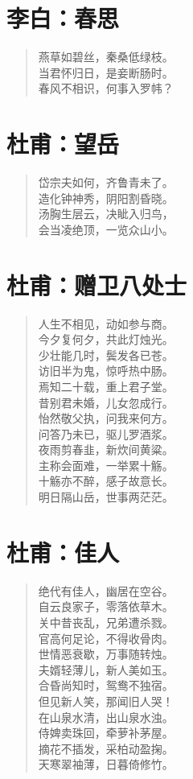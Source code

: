 \documentclass[12pt,oneside]{book}
\newenvironment{shici}{
\begin{verse}
\centering\large\hspace{12pt}}
{\end{verse}}
\begin{document}
\chapter{李白：春思}
\begin{shici}
燕草如碧丝，秦桑低绿枝。\\
当君怀归日，是妾断肠时。\\
春风不相识，何事入罗帏？
\end{shici}

\chapter{杜甫：望岳}
\begin{shici}
岱宗夫如何，齐鲁青未了。\\
造化钟神秀，阴阳割昏晓。\\
汤胸生层云，决眦入归鸟，\\
会当凌绝顶，一览众山小。
\end{shici}


\chapter{杜甫：赠卫八处士}
\begin{shici}
人生不相见，动如参与商。\\
今夕复何夕，共此灯烛光。\\
少壮能几时，鬓发各已苍。\\
访旧半为鬼，惊呼热中肠。\\
焉知二十载，重上君子堂。\\
昔别君未婚，儿女忽成行。\\
怡然敬父执，问我来何方。\\
问答乃未已，驱儿罗酒浆。\\
夜雨剪春韭，新炊间黄粱。\\
主称会面难，一举累十觞。\\
十觞亦不醉，感子故意长。\\
明日隔山岳，世事两茫茫。
\end{shici}


\chapter{杜甫：佳人}
\begin{shici}
绝代有佳人，幽居在空谷。\\
自云良家子，零落依草木。\\
关中昔丧乱，兄弟遭杀戮。\\
官高何足论，不得收骨肉。\\
世情恶衰歇，万事随转烛。\\
夫婿轻薄儿，新人美如玉。\\
合昏尚知时，鸳鸯不独宿。\\
但见新人笑，那闻旧人哭！\\
在山泉水清，出山泉水浊。\\
侍婢卖珠回，牵萝补茅屋。\\
摘花不插发，采柏动盈掬。\\
天寒翠袖薄，日暮倚修竹。
\end{shici}
\end{document}
